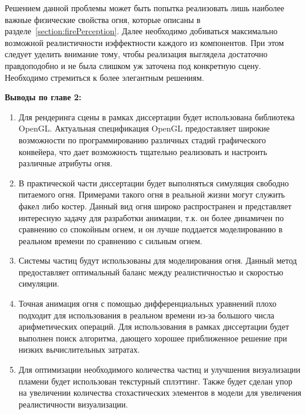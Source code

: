 Решением данной проблемы может быть попытка реализовать лишь наиболее важные
физические свойства огня, которые описаны в
разделе~\ref{section:firePerception}. Далее необходимо добиваться максимально
возможной реалистичности и\break{}эффектности каждого из компонентов. При этом
следует уделить внимание тому, чтобы реализация выглядела достаточно
правдоподобно и не была слишком уж заточена под конкретную сцену. Необходимо
стремиться к более элегантным решениям.

\textbf{Выводы по главе 2:}
\begin{enumerate}
    \item Для рендеринга сцены в рамках диссертации будет использована
        библиотека OpenGL\@. Актуальная спецификация OpenGL предоставляет
        широкие возможности по программированию различных стадий графического
        конвейера, что дает возможность тщательно реализовать и настроить
        различные атрибуты огня.
    \item В практической части диссертации будет выполняться симуляция свободно
        питаемого огня. Примерами такого огня в реальной жизни могут служить
        факел либо костер.  Данный вид огня широко распространен и
        представляет интересную задачу для разработки анимации, т\@.к\@. он
        более динамичен по сравнению со спокойным огнем, и он лучше поддается
        моделированию в реальном времени по сравнению с сильным огнем.
    \item Системы частиц будут использованы для моделирования огня. Данный метод
        предоставляет оптимальный баланс между реалистичностью и скоростью
        симуляции.
    \item Точная анимация огня с помощью дифференциальных уравнений плохо
        подходит для использования в реальном времени из-за большого
        числа\break{} арифметических операций. Для использования в рамках
        диссертации будет выполнен поиск алгоритма, дающего хорошее приближенное
        решение при низких вычислительных затратах.
    \item Для оптимизации необходимого количества частиц и улучшения
        визуализации пламени будет использован текстурный сплэттинг. Также будет
        сделан упор на увеличении количества стохастических элементов в
        модели для увеличения реалистичности визуализации.
\end{enumerate}
